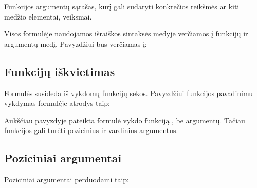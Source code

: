 \documentclass[letterpaper,10pt,lithuanian]{sphinxmanual}
\begin{document}
\begin{fulllineitems}

\pysigstartsignatures
\pysigline
{}
\pysigstopsignatures
\sphinxAtStartPar
Funkcijos argumentų sąrašas, kurį gali sudaryti konkrečios reikšmės ar kiti
medžio elementai, veiksmai.

\end{fulllineitems}


\sphinxAtStartPar
Visos formulėje naudojamos išraiškos sintaksės medyje verčiamos į funkcijų ir
argumentų medį. Pavyzdžiui  bus verčiamas į:

\begin{sphinxVerbatim}[commandchars=\\\{\}]
     
     \PYG{p}{[} \PYG{p}{]}
\end{sphinxVerbatim}


\subsection{Funkcijų iškvietimas}
\label{\detokenize{formules:funkciju-iskvietimas}}
\sphinxAtStartPar
Formulės susideda iš vykdomų funkcijų sekos. Pavyzdžiui funkcijos pavadinimu
 vykdymas formulėje atrodys taip:

\begin{sphinxVerbatim}[commandchars=\\\{\}]
\end{sphinxVerbatim}

\sphinxAtStartPar
Aukščiau pavyzdyje pateikta formulė vykdo funkciją , be argumentų. Tačiau
funkcijos gali turėti pozicinius ir vardinius argumentus.


\subsection{Poziciniai argumentai}
\label{\detokenize{formules:poziciniai-argumentai}}
\sphinxAtStartPar
Poziciniai argumentai perduodami taip:
\end{document}
